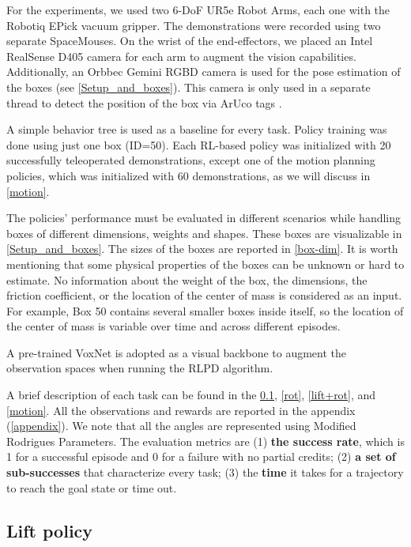 \documentclass[letterpaper, 10 pt, conference]{ieeeconf}  %
\begin{document}
For the experiments, we used two 6-DoF UR5e Robot Arms, each one with the Robotiq EPick vacuum gripper. The demonstrations were recorded using two separate SpaceMouses. On the wrist of the end-effectors, we placed an Intel RealSense D405 camera for each arm to augment the vision capabilities. Additionally, an Orbbec Gemini RGBD camera is used for the pose estimation of the boxes (see  \cref{Setup_and_boxes}). 
This camera is only used in a separate thread to detect the position of the box via ArUco tags \cite{GARRIDOJURADO20142280}.

A simple behavior tree is used as a baseline for every task. Policy training was done using just one box (ID=50). Each RL-based policy was initialized with 20 successfully teleoperated demonstrations, except one of the motion planning policies, which was initialized with 60 demonstrations, as we will discuss in \cref{motion}. 

The policies' performance must be evaluated in different scenarios while handling boxes of different dimensions, weights and shapes. These boxes are visualizable in  \cref{Setup_and_boxes}. The sizes of the boxes are reported in \cref{box-dim}. 
It is worth mentioning that some physical properties of the boxes can be unknown or hard to estimate. No information about the weight of the box, the dimensions, the friction coefficient, or the location of the center of mass is considered as an input. For example, Box 50 contains several smaller boxes inside itself, so the location of the center of mass is variable over time and across different episodes.

A pre-trained VoxNet is adopted as a visual backbone to augment the observation spaces when running the RLPD algorithm.

A brief description of each task can be found in the \cref{lift}, \cref{rot}, \cref{lift+rot}, and \cref{motion}. All the observations and rewards are reported in the appendix (\cref{appendix}). We note that all the angles are represented using Modified Rodrigues Parameters. %
The evaluation metrics are (1) \textbf{the success rate}, which is 1 for a successful episode and 0 for a failure with no partial credits; (2) \textbf{a set of sub-successes} that characterize every task; (3) the \textbf{time} it takes for a trajectory to reach the goal state or time out.

\subsection{Lift policy}\label{lift}
\end{document}
